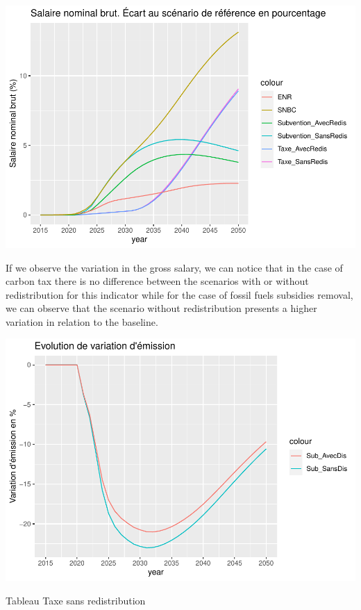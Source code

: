 \documentclass[
]{article}
\begin{document}
\begin{center}\includegraphics[width=0.7\linewidth,height=0.7\textheight]{Modele-ThreeMe-Tunisie_Sequeira_Valilou_Wang_files/figure-latex/unnamed-chunk-13-1} \end{center}

If we observe the variation in the gross salary, we can notice that in
the case of carbon tax there is no difference between the scenarios with
or without redistribution for this indicator while for the case of
fossil fuels subsidies removal, we can observe that the scenario without
redistribution presents a higher variation in relation to the baseline.

\begin{center}\includegraphics[width=0.7\linewidth,height=0.7\textheight]{Modele-ThreeMe-Tunisie_Sequeira_Valilou_Wang_files/figure-latex/unnamed-chunk-14-1} \end{center}

Tableau Taxe sans redistribution
\end{document}
